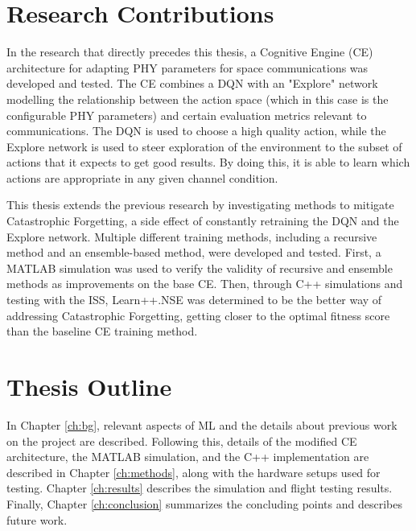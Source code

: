 \section{Research Contributions}
\par In the research that directly precedes this thesis\cite{paulo_theory_paper,tim_implementation_paper}, a Cognitive Engine (CE) architecture for adapting PHY parameters for space communications was developed and tested. The CE combines a DQN with an "Explore" network modelling the relationship between the action space (which in this case is the configurable PHY parameters) and certain evaluation metrics relevant to communications. The DQN is used to choose a high quality action, while the Explore network is used to steer exploration of the environment to the subset of actions that it expects to get good results. By doing this, it is able to learn which actions are appropriate in any given channel condition.  
\par This thesis extends the previous research by investigating methods to mitigate Catastrophic Forgetting, a side effect of constantly retraining the DQN and the Explore network. Multiple different training methods, including a recursive method and an ensemble-based method, were developed and tested. First, a MATLAB simulation was used to verify the validity of recursive and ensemble methods as improvements on the base CE. Then, through C++ simulations and testing with the ISS, Learn++.NSE was determined to be the better way of addressing Catastrophic Forgetting, getting closer to the optimal fitness score than the baseline CE training method. 

\section{Thesis Outline}
\par In Chapter \ref{ch:bg}, relevant aspects of ML and the details about previous work on the project are described. Following this, details of the modified CE architecture, the MATLAB simulation, and the C++ implementation are described in Chapter \ref{ch:methods}, along with the hardware setups used for testing. Chapter \ref{ch:results} describes the simulation and flight testing results. Finally, Chapter \ref{ch:conclusion} summarizes the concluding points and describes future work.
